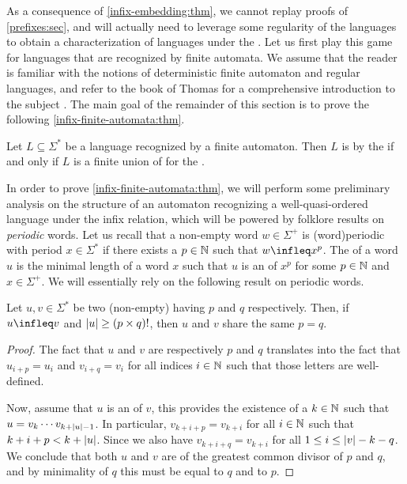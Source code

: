 As a consequence of \cref{infix-embedding:thm}, we cannot replay proofs of
\cref{prefixes:sec}, and will actually need to leverage some regularity of the
languages to obtain a characterization of  languages
under the . Let us first play this game for languages that
are recognized by finite automata. We assume that the reader is familiar with
the notions of deterministic finite automaton and regular languages, and refer
to the book of Thomas for a comprehensive introduction to the subject
\cite{THOM97}. The main goal of the remainder of this section is to prove the
following \cref{infix-finite-automata:thm}.

\begin{theorem}[restate=infix-finite-automata:thm,label=infix-finite-automata:thm]
    Let $L \subseteq \Sigma^*$ be a language recognized by a finite automaton.
    Then $L$ is  by the  if and only if $L$ is
    a finite union of  for the .
\end{theorem}

\AP In order to prove \cref{infix-finite-automata:thm}, we will perform some
preliminary analysis on the structure of an automaton recognizing a
well-quasi-ordered language under the infix relation, which will be powered by
folklore results on \emph{periodic} words. Let us recall that a non-empty word
$w \in \Sigma^+$ is \intro(word){periodic} with period $x \in \Sigma^*$ if
there exists a $p \in \mathbb{N}$ such that $w \infleq x^p$. The  of a word $u$ is the minimal length of a word $x$ such that $u$ is an
 of $x^p$ for some $p \in \mathbb{N}$ and $x \in \Sigma^+$. We will
essentially rely on the following result on periodic words.

\begin{lemma}
    \label{periodic-infixes:lem}
    Let $u,v \in \Sigma^*$ be two (non-empty) 
    having  $p$ and $q$ respectively.
    Then, if $u \infleq v$ and $\card{u} \geq \factorial[p]{p \times q}$,
    then $u$ and $v$ share the same 
    $p = q$.
\end{lemma}
\begin{proof}
    The fact that $u$ and $v$ are 
    respectively $p$ and $q$ translates into the fact that $u_{i+p} = u_i$ and
    $v_{i+q} = v_i$ for all indices $i \in \mathbb{N}$ such that those letters are
    well-defined.

    Now, assume that $u$ is an  of $v$, this provides the existence
    of a $k \in \mathbb{N}$ such that $u = v_{k} \cdots v_{k + \left| u \right| - 1}$. In
    particular, $v_{k+i+p} = v_{k+i}$ for all $i \in \mathbb{N}$ such that $k+i+p < k
    + \left| u \right|$. Since we also have $v_{k+i+q} = v_{k+i}$ for all $1 \leq i
    \leq \left| v \right| - k - q$. We conclude that both $u$ and $v$ are of
     the greatest common divisor of $p$ and $q$, and by
    minimality of $q$ this must be equal to $q$ and to $p$.
\end{proof}

